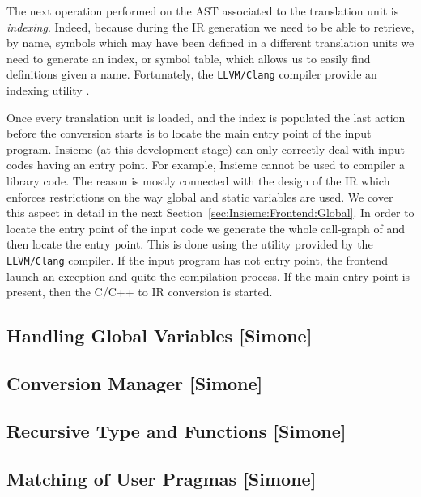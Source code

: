 The next operation performed on the AST associated to the translation unit is
\emph{indexing}. Indeed, because during the IR generation we need to be able to
retrieve, by name, symbols which may have been defined in a different
translation units we need to generate an index, or symbol table, which allows us
to easily find definitions given a name. Fortunately, the {\tt LLVM/Clang}
compiler provide an indexing utility .

Once every translation unit is loaded, and the index is populated the last
action before the conversion starts is to locate the main entry point of the
input program. Insieme (at this development stage) can only correctly deal with
input codes having an entry point. For example, Insieme cannot be used to
compiler a library code. The reason is mostly connected with the design
of the IR which enforces restrictions on the way global and static variables are
used. We cover this aspect in detail in the next
Section~\ref{sec:Insieme:Frontend:Global}. In order to locate the entry point of
the input code we generate the whole call-graph of and then locate the entry
point. This is done using the  utility provided by the
{\tt LLVM/Clang} compiler. If the input program has not entry point, the
frontend launch an exception and quite the compilation process. If the main
entry point is present, then the C/C++ to IR conversion is started. 

\subsection{Handling Global Variables [Simone]}
\label{sec:Insieme.Frontend.Global}

\subsection{Conversion Manager [Simone]}
\label{sec:Insieme.Convert}

\subsection{Recursive Type and Functions [Simone]}
\label{sec:Insieme.Recursion}

\subsection{Matching of User Pragmas [Simone]}
\label{sec:Insieme.Pragmas}






